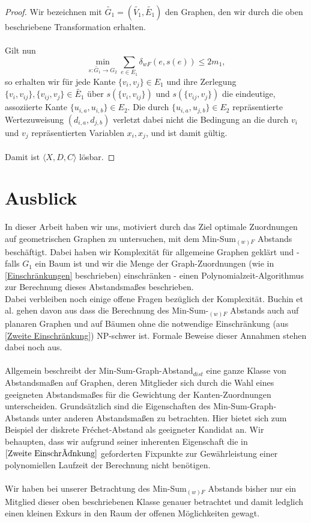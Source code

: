 \documentclass[a4paper, 12pt, twoside]{article}
\theoremstyle{Format1} %
\begin{document}
\begin{proof}
Wir bezeichnen mit $\tilde{G_1}=(\tilde{V_1}, \tilde{E_1})$ den Graphen, den wir durch die oben beschriebene Transformation erhalten.
\\
\\
Gilt nun
$$ \min_{s: \tilde{G_1} \to G_2} \sum_{e \in E_1} \delta_{wF}(e, s(e)) \leq 2m_1, $$
so erhalten wir für jede Kante $\{v_i, v_j\} \in E_1$ und ihre Zerlegung $\{v_i, v_{ij}\},\{v_{ij}, v_j\} \in \tilde{E_1}$
über $s(\{v_i, v_{ij}\})$ und $s(\{v_{ij}, v_j\})$ die eindeutige, assoziierte Kante $\{u_{i,a}, u_{i,b}\} \in E_2$.
Die durch $\{u_{i,a}, u_{j,b}\} \in E_2$ repräsentierte Wertezuweisung $(d_{i,a}, d_{j,b})$ verletzt dabei nicht die Bedingung an die
durch $v_i$ und $v_j$ repräsentierten Variablen $x_i, x_j$, und ist damit gültig.
\\
\\
Damit ist $\langle X,D,C \rangle$ lösbar.
\end{proof}

\newpage

\section{Ausblick}
In dieser Arbeit haben wir uns, motiviert durch das Ziel optimale Zuordnungen auf geometrischen Graphen zu untersuchen, mit dem
Min-Sum$_{(w)F}$ Abstands beschäftigt. Dabei haben wir Komplexität für allgemeine
Graphen geklärt und - falls $G_1$ ein Baum ist und wir die Menge der Graph-Zuordnungen (wie in \ref{Einschränkungen} beschrieben) einschränken -
einen Polynomialzeit-Algorithmus zur Berechnung dieses Abstandsmaßes beschrieben.
\\
Dabei verbleiben noch einige offene Fragen bezüglich der Komplexität.
Buchin et al. \cite{Buchin} gehen davon aus dass die Berechnung des Min-Sum-$_{(w)F}$ Abstands auch auf planaren Graphen und
auf Bäumen ohne die notwendige Einschränkung (aus \ref{Zweite Einschränkung}) NP-schwer ist.
Formale Beweise dieser Annahmen stehen dabei noch aus.
\\
\\
Allgemein beschreibt der Min-Sum-Graph-Abstand$_{dist}$ eine ganze Klasse von Abstandsmaßen auf Graphen, deren Mitglieder sich durch die Wahl
eines geeigneten Abstandsmaßes für die Gewichtung der Kanten-Zuordnungen unterscheiden.
Grundsätzlich sind die Eigenschaften des Min-Sum-Graph-Abstands unter anderen Abstandsmaßen zu betrachten. Hier bietet sich zum Beispiel der
diskrete Fréchet-Abstand als geeigneter Kandidat an. Wir behaupten, dass wir aufgrund seiner inherenten Eigenschaft die in $\ref{Zweite Einschränkung}$
geforderten Fixpunkte zur Gewährleistung einer polynomiellen Laufzeit der Berechnung nicht benötigen.
\\
\\
Wir haben bei unserer Betrachtung des Min-Sum$_{(w)F}$ Abstands bisher nur ein Mitglied dieser oben beschriebenen Klasse genauer betrachtet und
damit ledglich einen kleinen Exkurs in den Raum der offenen Möglichkeiten gewagt.
\newpage\null\thispagestyle{empty}\newpage
\end{document}
